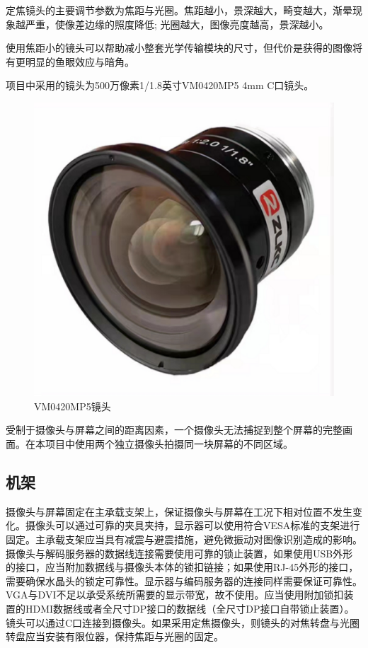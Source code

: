 定焦镜头的主要调节参数为焦距与光圈。焦距越小，景深越大，畸变越大，渐晕现象越严重，使像差边缘的照度降低; 光圈越大，图像亮度越高，景深越小。\cite{刘混海2009基于机器视觉的集成芯片基板定位技术研究}

使用焦距小的镜头可以帮助减小整套光学传输模块的尺寸，但代价是获得的图像将有更明显的鱼眼效应与暗角。

项目中采用的镜头为500万像素1/1.8英寸VM0420MP5 4mm C口镜头。

\begin{figure}[!htbp]
\centering
\includegraphics[scale=1.4]{figures/HW/VM0420MP5.png}
\caption{VM0420MP5镜头}
\end{figure}

受制于摄像头与屏幕之间的距离因素，一个摄像头无法捕捉到整个屏幕的完整画面。在本项目中使用两个独立摄像头拍摄同一块屏幕的不同区域。

\subsection{机架}

摄像头与屏幕固定在主承载支架上，保证摄像头与屏幕在工况下相对位置不发生变化。摄像头可以通过可靠的夹具夹持，显示器可以使用符合VESA标准的支架进行固定。主承载支架应当具有减震与避震措施，避免微振动对图像识别造成的影响。摄像头与解码服务器的数据线连接需要使用可靠的锁止装置，如果使用USB外形的接口，应当附加数据线与摄像头本体的锁扣链接；如果使用RJ-45外形的接口，需要确保水晶头的锁定可靠性。显示器与编码服务器的连接同样需要保证可靠性。VGA与DVI不足以承受系统所需要的显示带宽，故不使用。应当使用附加锁扣装置的HDMI数据线或者全尺寸DP接口的数据线（全尺寸DP接口自带锁止装置）。镜头可以通过C口连接到摄像头。如果采用定焦摄像头，则镜头的对焦转盘与光圈转盘应当安装有限位器，保持焦距与光圈的固定。

